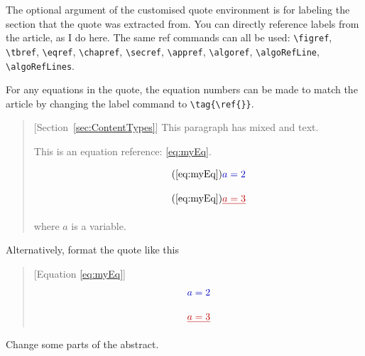 \documentclass{AuthorResponse}
\newcommand{\figref}[1]{Fig.~\ref{#1}}
\newcommand{\tbref}[1]{Table~\ref{#1}}
\newcommand{\secref}[1]{Section~\ref{#1}}
\begin{document}
The optional argument of the customised quote environment is for labeling the section that the quote was extracted from. You can directly reference labels from the article, as I do here. The same ref commands can all be used: \verb|\figref|, \verb|\tbref|, \verb|\eqref|, \verb|\chapref|, \verb|\secref|, \verb|\appref|, \verb|\algoref|, \verb|\algoRefLine|, \verb|\algoRefLines|.

For any equations in the quote, the equation numbers can be made to match the article by changing the label command to \verb|\tag{\ref{}}|.

\begin{quote}[\secref{sec:ContentTypes}]
	This paragraph has mixed  and  text.



	This is an equation reference: \eqref{eq:myEq}.

	\begin{equation} \tag{\ref{eq:myEq}}
		\DIFadd{a = 2}
	\end{equation}

	\begin{equation} \tag{\ref{eq:myEq}}
		\DIFdel{a = 3}
	\end{equation}
	
	where $a$ is a variable.
\end{quote}

Alternatively, format the quote like this

\begin{quote}[Equation \ref{eq:myEq}]
	\begin{equation} \notag
		\DIFadd{a = 2}
	\end{equation}

	\begin{equation} \notag
		\DIFdel{a = 3}
	\end{equation}
\end{quote}

\RC Change some parts of the abstract.
\end{document}
